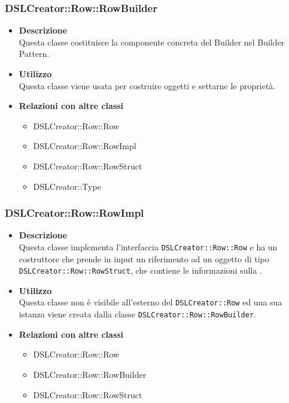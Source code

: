  \subsubsection{DSLCreator::Row::RowBuilder}
                    \begin{itemize}
                        \item \textbf{Descrizione} \hfill \\
                          Questa classe costituisce la componente concreta del Builder nel Builder Pattern.
                        \item \textbf{Utilizzo} \hfill \\
                          Questa classe viene usata per costruire oggetti  e settarne le proprietà.
                        \item \textbf{Relazioni con altre classi}
                            \begin{itemize}
                              \item DSLCreator::Row::Row
                              \item DSLCreator::Row::RowImpl
                              \item DSLCreator::Row::RowStruct
                              \item DSLCreator::Type
                            \end{itemize}
                    \end{itemize}  

 \subsubsection{DSLCreator::Row::RowImpl}
                    \begin{itemize}
                        \item \textbf{Descrizione} \hfill \\
                          Questa classe implementa l'interfaccia \texttt{DSLCreator::Row::Row} e ha un costruttore che prende in input un riferimento ad un oggetto di tipo \texttt{DSLCreator::Row::RowStruct}, che contiene le informazioni sulla .
                        \item \textbf{Utilizzo} \hfill \\
                          Questa classe non è visibile all'esterno del  \texttt{DSLCreator::Row} ed una sua istanza viene creata dalla classe \texttt{DSLCreator::Row::RowBuilder}.
                        \item \textbf{Relazioni con altre classi}
                            \begin{itemize}
                              \item DSLCreator::Row::Row
                              \item DSLCreator::Row::RowBuilder
                              \item DSLCreator::Row::RowStruct
                            \end{itemize}
                    \end{itemize}  

